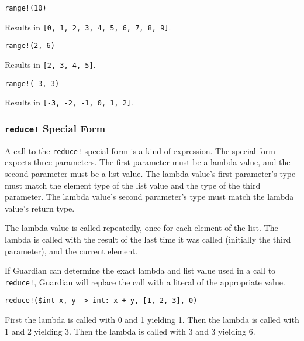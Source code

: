 {{		\begin{itemize}
		{
			\item[] \lstinline[language=MAIA, columns=fixed]@range!(10)@
			
				Results in \lstinline[language=MAIA, columns=fixed]@[0, 1, 2, 3, 4, 5, 6, 7, 8, 9]@.
			
			\item[] \lstinline[language=MAIA, columns=fixed]@range!(2, 6)@
			
				Results in \lstinline[language=MAIA, columns=fixed]@[2, 3, 4, 5]@.
				
			\item[] \lstinline[language=MAIA, columns=fixed]@range!(-3, 3)@
			
				Results in \lstinline[language=MAIA, columns=fixed]@[-3, -2, -1, 0, 1, 2]@.
		}
		\end{itemize}
	}
	
	\subsubsection{\lstinline[language=MAIA, columns=fixed]@reduce!@ Special Form}
	{
		A call to the \lstinline[language=MAIA, columns=fixed]@reduce!@ special form is a kind of expression.
		The special form expects three parameters.
		The first parameter must be a lambda value, and the
		second parameter must be a list value.
		The lambda value's first parameter's type
		must match the element type of the list value and the type of the third
		parameter. The lambda value's
		second parameter's type must match the lambda value's return type.
		
		The lambda value is called repeatedly, once for each element of the list.
		The lambda is called with the result of the last time it was
		called (initially the third parameter), and
		the current element.
		
		If Guardian can determine the exact lambda and list value used in a call to
		\lstinline[language=MAIA, columns=fixed]@reduce!@, Guardian will replace the call with a literal of
		the appropriate value.
		
		\begin{itemize}
		{
			\item[] \lstinline[language=MAIA, columns=fixed]@reduce!($int x, y -> int: x + y, [1, 2, 3], 0)@
			
				First the lambda is called with 0 and 1 yielding 1.
				Then the lambda is called with 1 and 2 yielding 3.
				Then the lambda is called with 3 and 3 yielding 6.
			
}
\end{itemize}}}
